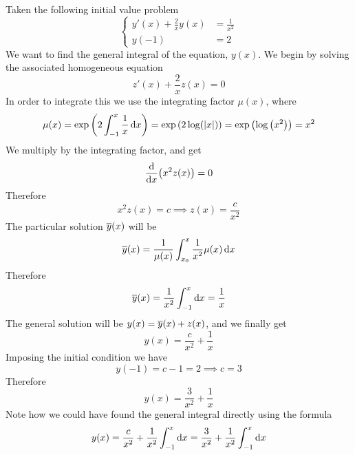 \documentclass[../complete.tex]{subfiles}
\begin{document}
\begin{eg}
	Taken the following initial value problem
	\begin{equation*}
		\left\{ \begin{aligned}
				y'(x)+\frac{2}{x}y(x)&=\frac{1}{x^2}\\
				y(-1)&=2
		\end{aligned}\right.
	\end{equation*}
	We want to find the general integral of the equation, $y(x)$. We begin by solving the associated homogeneous equation
	\begin{equation*}
		z'(x)+\frac{2}{x}z(x)=0
	\end{equation*}
	In order to integrate this we use the integrating factor $\mu(x)$, where
	\begin{equation*}
		\mu(x)=\exp\left( 2\int_{-1}^{x}\frac{1}{x}\operatorname{d\!} x \right)=\exp\left( 2\log(\abs{x}) \right)=\exp\left( \log\left( x^2 \right) \right)=x^2
	\end{equation*}
	We multiply by the integrating factor, and get
	\begin{equation*}
		\derivative{x}(x^2z(x))=0
	\end{equation*}
	Therefore
	\begin{equation*}
		x^2z(x)=c\implies z(x)=\frac{c}{x^2}
	\end{equation*}
	The particular solution $\overline{y}(x)$ will be
	\begin{equation*}
		\overline{y}(x)=\frac{1}{\mu(x)}\int_{x_0}^{x}\frac{1}{x^2}\mu(x)\operatorname{d\!} x
	\end{equation*}
	Therefore
	\begin{equation*}
		\overline{y}(x)=\frac{1}{x^2}\int_{-1}^{x}\operatorname{d\!} x=\frac{1}{x}
	\end{equation*}
	The general solution will be $y(x)=\overline{y}(x)+z(x)$, and we finally get
	\begin{equation*}
		y(x)=\frac{c}{x^2}+\frac{1}{x}
	\end{equation*}
	Imposing the initial condition we have
	\begin{equation*}
		y(-1)=c-1=2\implies c=3
	\end{equation*}
	Therefore
	\begin{equation*}
		y(x)=\frac{3}{x^2}+\frac{1}{x}
	\end{equation*}
	Note how we could have found the general integral directly using the formula
	\begin{equation*}
		y(x)=\frac{c}{x^2}+\frac{1}{x^2}\int_{-1}^{x}\operatorname{d\!} x=\frac{3}{x^2}+\frac{1}{x^2}\int_{-1}^{x}\operatorname{d\!} x
	\end{equation*}
\end{eg}
\end{document}
